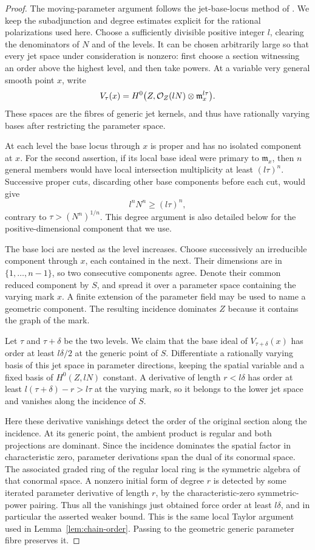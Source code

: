 \begin{proof}
The moving-parameter argument follows the jet-base-locus method of
\cite[Proposition~2.3]{EinKuchleLazarsfeld1995}. We keep the
subadjunction and degree estimates explicit for the rational
polarizations used here.
Choose a sufficiently divisible positive integer $l$, clearing the
denominators of $N$ and of the levels.  It can be chosen arbitrarily
large so that every jet space under consideration is nonzero: first
choose a section witnessing an order above the highest level, and
then take powers.  At a variable very general smooth point $x$, write
\[
 V_\tau(x)=
 H^0\bigl(Z,\mathcal O_Z(lN)\otimes\mathfrak m_x^{l\tau}\bigr).
\]
These spaces are the fibres of generic jet kernels, and thus have
rationally varying bases after restricting the parameter space.

At each level the base locus through $x$ is proper and has no isolated
component at $x$.  For the second assertion, if its local base ideal
were primary to $\mathfrak m_x$, then $n$ general members would have
local intersection multiplicity at least $(l\tau)^n$.  Successive
proper cuts, discarding other base components before each cut, would
give
\[
 l^nN^n\ge(l\tau)^n,
\]
contrary to $\tau>(N^n)^{1/n}$.  This degree argument is also detailed
below for the positive-dimensional component that we use.

The base loci are nested as the level increases.  Choose successively
an irreducible component through $x$, each contained in the next.
Their dimensions are in $\{1,\ldots,n-1\}$, so two consecutive
components agree.  Denote their common reduced component by $S$,
and spread it over a parameter space containing the varying mark $x$.
A finite extension of the parameter field may be used to name a
geometric component.  The resulting incidence dominates $Z$ because
it contains the graph of the mark.

Let $\tau$ and $\tau+\delta$ be the two levels.  We claim that the
base ideal of $V_{\tau+\delta}(x)$ has order at least $l\delta/2$ at
the generic point of $S$.  Differentiate a rationally varying basis
of this jet space in parameter directions, keeping the spatial
variable and a fixed basis of $H^0(Z,lN)$ constant.  A derivative of
length $r<l\delta$ has order at least $l(\tau+\delta)-r>l\tau$
at the varying mark, so it belongs to the lower jet space and
vanishes along the incidence of $S$.

Here these derivative vanishings detect the order of the original
section along the incidence.  At its generic point, the ambient
product is regular and both projections are dominant.  Since the
incidence dominates the spatial factor in characteristic zero,
parameter derivations span the dual of its conormal space.  The
associated graded ring of the regular local ring is the symmetric
algebra of that conormal space.  A nonzero initial form of degree
$r$ is detected by some iterated parameter derivative of length $r$,
by the characteristic-zero symmetric-power pairing.  Thus all the
vanishings just obtained force order at least $l\delta$, and in
particular the asserted weaker bound.  This is the same local Taylor
argument used in Lemma~\ref{lem:chain-order}.  Passing to the
geometric generic parameter fibre preserves it.


\end{proof}
